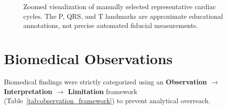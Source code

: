 \documentclass[11pt, a4paper]{article}
\begin{document}
\begin{figure}[htbp]
    \centering
    \caption{Zoomed visualization of manually selected representative cardiac cycles. The P, QRS, and T landmarks are approximate educational annotations, not precise automated fiducial measurements.}
    \label{fig:zoomed_pqrst}
\end{figure}

\section{Biomedical Observations}
Biomedical findings were strictly categorized using an \textbf{Observation $\rightarrow$ Interpretation $\rightarrow$ Limitation} framework (Table~\ref{tab:observation_framework}) to prevent analytical overreach.
\end{document}
